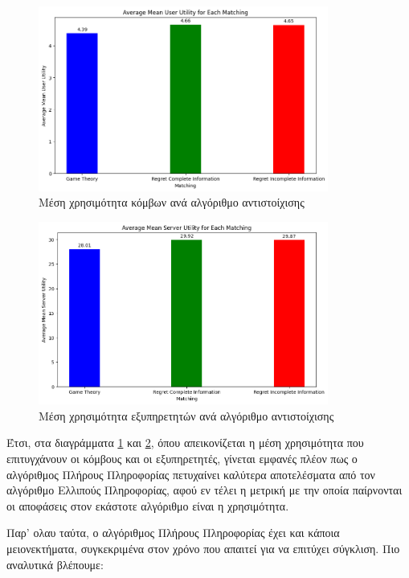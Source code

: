 \begin{figure}[H]
    \centering
    \includegraphics[width=0.85\textwidth]{figures/chapter4/Average_Mean_User_Utility.png}
    \caption{Μέση χρησιμότητα κόμβων ανά αλγόριθμο αντιστοίχισης}
    \label{fig27}
\end{figure}

\begin{figure}[H]
    \centering
    \includegraphics[width=0.85\textwidth]{figures/chapter4/Average_Mean_Server_Utility.png}
    \caption{Μέση χρησιμότητα εξυπηρετητών ανά αλγόριθμο αντιστοίχισης}
    \label{fig28}
\end{figure}

Έτσι, στα διαγράμματα \ref{fig27} και \ref{fig28}, όπου απεικονίζεται η μέση χρησιμότητα που επιτυγχάνουν οι κόμβους και οι εξυπηρετητές, γίνεται εμφανές πλέον πως ο αλγόριθμος Πλήρους Πληροφορίας πετυχαίνει καλύτερα αποτελέσματα από τον αλγόριθμο Ελλιπούς Πληροφορίας, αφού εν τέλει η μετρική με την οποία παίρνονται οι αποφάσεις στον εκάστοτε αλγόριθμο είναι η χρησιμότητα. 

Παρ' ολαυ ταύτα, ο αλγόριθμος Πλήρους Πληροφορίας έχει και κάποια μειονεκτήματα, συγκεκριμένα στον χρόνο που απαιτεί για να επιτύχει σύγκλιση. Πιο αναλυτικά βλέπουμε:

